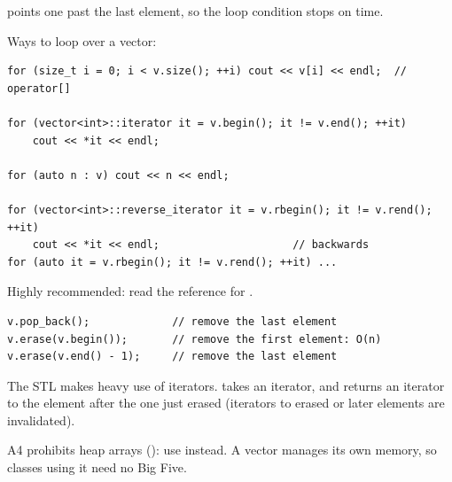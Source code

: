 \begin{center}

\small {} points one past the last element, so the loop condition  stops on time.
\end{center}

Ways to loop over a vector:
\begin{lstlisting}[style=cpp]
for (size_t i = 0; i < v.size(); ++i) cout << v[i] << endl;  // operator[]

for (vector<int>::iterator it = v.begin(); it != v.end(); ++it)
    cout << *it << endl;

for (auto n : v) cout << n << endl;

for (vector<int>::reverse_iterator it = v.rbegin(); it != v.rend(); ++it)
    cout << *it << endl;                     // backwards
for (auto it = v.rbegin(); it != v.rend(); ++it) ...
\end{lstlisting}
Highly recommended: read the reference for .

\begin{lstlisting}[style=cpp]
v.pop_back();             // remove the last element
v.erase(v.begin());       // remove the first element: O(n)
v.erase(v.end() - 1);     // remove the last element
\end{lstlisting}
The STL makes heavy use of iterators.  takes an iterator,
and returns an iterator to the element after the one just erased (iterators to
erased or later elements are invalidated).

\begin{important}[Assignment 4]
A4 prohibits heap arrays (): use  instead. A vector
manages its own memory, so classes using it need no Big Five.
\end{important}


